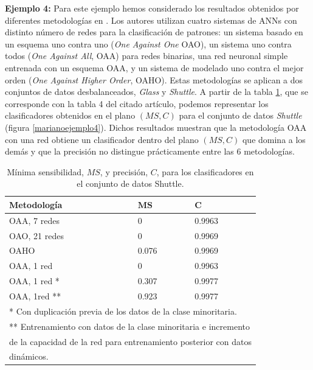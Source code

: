 \textbf{Ejemplo 4:} Para este ejemplo hemos considerado los resultados obtenidos por
diferentes metodologías en \cite{Ou2007}. Los autores utilizan cuatro sistemas de ANNs con distinto
número de redes para la clasificación de patrones:
un sistema basado en un esquema uno contra uno (\textit{One Against One} OAO), un sistema
uno contra todos (\textit{One Against All}, OAA) para redes binarias, una red neuronal
simple entrenada con un esquema OAA, y un sistema de modelado uno contra el mejor orden
(\textit{One Against Higher Order}, OAHO). Estas metodologías se aplican a dos conjuntos
de datos desbalanceados, \textit{Glass} y \textit{Shuttle}. A partir de la tabla
\ref{tablaEjemplo4}, que se corresponde con la tabla 4 del citado artículo, podemos
representar los clasificadores obtenidos en el plano $(MS,C)$ para el conjunto de datos
\textit{Shuttle} (figura \ref{marianoejemplo4}). Dichos resultados muestran que la
metodología OAA con una red obtiene un clasificador dentro del plano $(MS,C)$ que domina a
los demás y que la precisión no distingue prácticamente entre las 6 metodologías.

\begin{table}[!htb]
\caption{Mínima sensibilidad, $MS$, y precisión, $C$, para los clasificadores en el
conjunto de datos Shuttle.}
\label{tablaEjemplo4}
\centering
\begin{tabular}{p{4cm}p{3.2cm}p{2.8cm}} \hline
\rowcolor[rgb]{0.70,0.85,1}\textbf{Metodología} & $\mathbf{MS}$ & $\mathbf{C}$\\ \hline
\rowcolor[rgb]{0.86,0.94,1}OAA, 7 redes & 0 & 0.9963\\
\rowcolor[rgb]{0.86,0.94,1}OAO, 21 redes & 0 & 0.9969\\
\rowcolor[rgb]{0.86,0.94,1}OAHO & 0.076 & 0.9969\\
\rowcolor[rgb]{0.86,0.94,1}OAA, 1 red & 0 & 0.9963\\
\rowcolor[rgb]{0.86,0.94,1}OAA, 1 red * & 0.307 & 0.9977\\
\rowcolor[rgb]{0.86,0.94,1}OAA, 1red ** & 0.923 & 0.9977 \\ \hline
\multicolumn{3}{l}{* Con duplicación previa de los datos de la clase minoritaria.} \\
\multicolumn{3}{l}{** Entrenamiento con datos de la clase minoritaria e incremento}
\\
\multicolumn{3}{l}{de la capacidad de la red para entrenamiento posterior con datos} \\
\multicolumn{3}{l}{dinámicos.}
\end{tabular}
\end{table}

